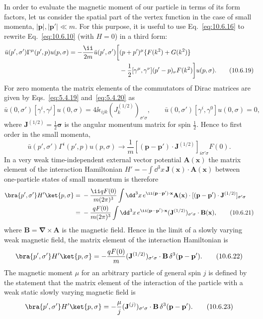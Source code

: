 In order to evaluate the magnetic moment of our particle in terms of its form
factors, let us consider the spatial part of the vertex function in the case
of small momenta, $|\mathbf{p}|,|\mathbf{p}'|\ll m$. For this purpose, it is
useful to use Eq.~\eqref{eq:10.6.16} to rewrite Eq.~\eqref{eq:10.6.10} (with
$H=0$) in a third form:
\begin{align}
  \bar u(p',\sigma')\Gamma^\mu(p',p)u(p,\sigma)
  =-\frac{\ii}{2m}\bar u(p',\sigma')\biggl[&
  (p+p')^\mu\{F(k^2)+G(k^2)\} \notag\\
  &-\frac12[\gamma^\mu,\gamma^\nu](p'-p)_\nu F(k^2)
  \biggr]u(p,\sigma).
  \tag{10.6.19}\label{eq:10.6.19}
\end{align}
For zero momenta the matrix elements of the commutators of Dirac matrices are
given by Eqs.~\eqref{eq:5.4.19} and~\eqref{eq:5.4.20} as
\begin{equation*}
  \bar u(0,\sigma')[\gamma^i,\gamma^j]u(0,\sigma)
  =4\ii\epsilon_{ijk}(J_k^{(1/2)})_{\sigma'\sigma},
  \qquad
  \bar u(0,\sigma')[\gamma^i,\gamma^0]u(0,\sigma)=0,
\end{equation*}
where $\mathbf{J}^{(1/2)}=\frac12\boldsymbol{\sigma}$ is the angular momentum
matrix for spin $\frac12$. Hence to first order in the small momenta,
\begin{equation}
  \bar u(p',\sigma')\Gamma^i(p',p)u(p,\sigma)
  \longrightarrow\frac1m
  [ (\mathbf{p}-\mathbf{p}')\cdot\mathbf{J}^{(1/2)}]_{i\sigma'\sigma}F(0).
  \tag{10.6.20}\label{eq:10.6.20}
\end{equation}
In a very weak time-independent external vector potential $\mathbf{A}(\mathbf{x})$
the matrix element of the interaction Hamiltonian
$H'=-\int \dd^3x\,\mathbf{J}(\mathbf{x})\cdot\mathbf{A}(\mathbf{x})$ between
one-particle states of small momentum is therefore
\begin{align}
  \bra{p',\sigma'}H'\ket{p,\sigma}
  ={}&-\frac{\ii qF(0)}{m(2\pi)^3}\int \dd^3x\,
  e^{\ii(\mathbf{p}-\mathbf{p}')\cdot\mathbf{x}}
  \mathbf{A}(\mathbf{x})\cdot
  [ (\mathbf{p}-\mathbf{p}')\cdot\mathbf{J}^{(1/2)}]_{\sigma'\sigma}
  \notag\\
  ={}&-\frac{qF(0)}{m(2\pi)^3}\int \dd^3x\,
  e^{\ii(\mathbf{p}-\mathbf{p}')\cdot\mathbf{x}}
  (\mathbf{J}^{(1/2)})_{\sigma'\sigma}\cdot\mathbf{B}(\mathbf{x}),
  \tag{10.6.21}\label{eq:10.6.21}
\end{align}
where $\mathbf{B}=\boldsymbol{\nabla}\times\mathbf{A}$ is the magnetic field.
Hence in the limit of a slowly varying weak magnetic field, the matrix element
of the interaction Hamiltonian is
\begin{equation}
  \bra{p',\sigma'}H'\ket{p,\sigma}
  =-\frac{qF(0)}m(\mathbf{J}^{(1/2)})_{\sigma'\sigma}\cdot\mathbf{B}\,
  \delta^3(\mathbf{p}-\mathbf{p}').
  \tag{10.6.22}\label{eq:10.6.22}
\end{equation}
The magnetic moment $\mu$ for an arbitrary particle of general spin $j$ is
defined by the statement that the matrix element of the interaction of the
particle with a weak static slowly varying magnetic field is
\begin{equation}
  \bra{p',\sigma'}H'\ket{p,\sigma}
  =-\frac{\mu}{j}(\mathbf{J}^{(j)})_{\sigma'\sigma}\cdot\mathbf{B}\,
  \delta^3(\mathbf{p}-\mathbf{p}').
  \tag{10.6.23}\label{eq:10.6.23}
\end{equation}
